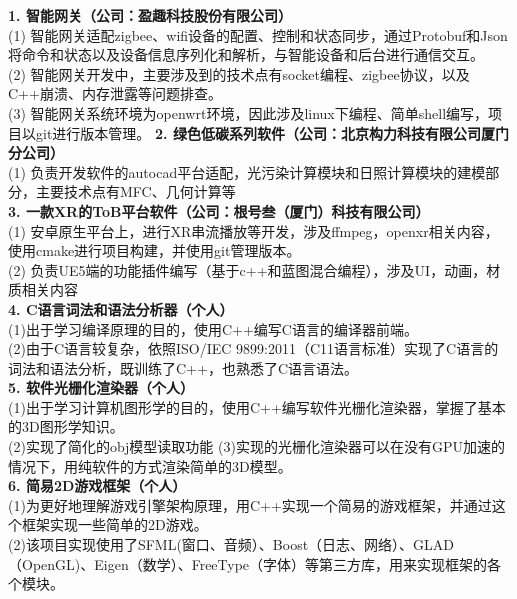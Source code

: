 \documentclass{resume} %
\begin{document}
\begin{rSection}{}
\textbf{1.	智能网关（公司：盈趣科技股份有限公司）}\\
(1) 智能网关适配zigbee、wifi设备的配置、控制和状态同步，通过Protobuf和Json将命令和状态以及设备信息序列化和解析，与智能设备和后台进行通信交互。 \\
(2) 智能网关开发中，主要涉及到的技术点有socket编程、zigbee协议，以及C++崩溃、内存泄露等问题排查。 \\
(3) 智能网关系统环境为openwrt环境，因此涉及linux下编程、简单shell编写，项目以git进行版本管理。
\textbf{2. 绿色低碳系列软件（公司：北京构力科技有限公司厦门分公司）}\\
(1) 负责开发软件的autocad平台适配，光污染计算模块和日照计算模块的建模部分，主要技术点有MFC、几何计算等\\
\textbf{3. 一款XR的ToB平台软件（公司：根号叁（厦门）科技有限公司）}\\ 
(1) 安卓原生平台上，进行XR串流播放等开发，涉及ffmpeg，openxr相关内容，使用cmake进行项目构建，并使用git管理版本。 \\
(2) 负责UE5端的功能插件编写（基于c++和蓝图混合编程），涉及UI，动画，材质相关内容 \\
\textbf{4.  C语言词法和语法分析器（个人）}\\
(1)出于学习编译原理的目的，使用C++编写C语言的编译器前端。\\
(2)由于C语言较复杂，依照ISO/IEC 9899:2011（C11语言标准）实现了C语言的词法和语法分析，既训练了C++，也熟悉了C语言语法。 \\
\textbf{5.  软件光栅化渲染器（个人）}\\
(1)出于学习计算机图形学的目的，使用C++编写软件光栅化渲染器，掌握了基本的3D图形学知识。\\
(2)实现了简化的obj模型读取功能
(3)实现的光栅化渲染器可以在没有GPU加速的情况下，用纯软件的方式渲染简单的3D模型。\\
\textbf{6.	简易2D游戏框架（个人）}\\
(1)为更好地理解游戏引擎架构原理，用C++实现一个简易的游戏框架，并通过这个框架实现一些简单的2D游戏。 \\
(2)该项目实现使用了SFML(窗口、音频）、Boost（日志、网络）、GLAD（OpenGL)、Eigen（数学）、FreeType（字体）等第三方库，用来实现框架的各个模块。\\



\end{rSection}


\end{document}

